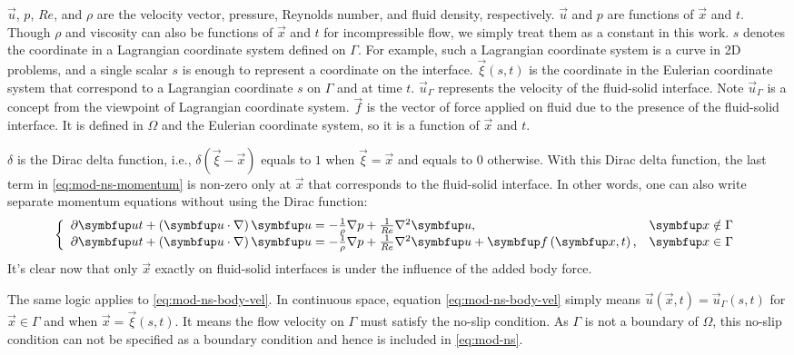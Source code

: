 $\vec{u}$, $p$, $Re$, and $\rho$ are the velocity vector, pressure, Reynolds number, and fluid density, respectively.
$\vec{u}$ and $p$ are functions of $\vec{x}$ and $t$.
Though $\rho$ and viscosity can also be functions of $\vec{x}$ and $t$ for incompressible flow, we simply treat them as a constant in this work.
$s$ denotes the coordinate in a Lagrangian coordinate system defined on $\Gamma$.
For example, such a Lagrangian coordinate system is a curve in 2D problems, and a single scalar $s$ is enough to represent a coordinate on the interface.
$\vec{\xi}(s, t)$ is the coordinate in the Eulerian coordinate system that correspond to a Lagrangian coordinate $s$ on $\Gamma$ and at time $t$.
$\vec{u}_\Gamma$ represents the velocity of the fluid-solid interface.
Note $\vec{u}_\Gamma$ is a concept from the viewpoint of Lagrangian coordinate system.
$\vec{f}$ is the vector of force applied on fluid due to the presence of the fluid-solid interface.
It is defined in $\Omega$ and the Eulerian coordinate system, so it is a function of $\vec{x}$ and $t$.

$\delta$ is the Dirac delta function, i.e., $\delta(\vec{\xi}-\vec{x})$ equals to $1$ when $\vec{\xi} = \vec{x}$ and equals to $0$ otherwise.
With this Dirac delta function, the last term in \eqref{eq:mod-ns-momentum} is non-zero only at $\vec{x}$ that corresponds to the fluid-solid interface.
In other words, one can also write separate momentum equations without using the Dirac function:
\begin{equation}
\left\{
    \begin{array}{ll}
        \pdiff{\vec{u}}{t} + \left(\vec{u} \cdot \nabla\right) \vec{u}
            = -\frac{1}{\rho}\nabla p + \frac{1}{Re} \nabla^2 \vec{u}\text{,} & \vec{x} \notin \Gamma \\
        \pdiff{\vec{u}}{t} + \left(\vec{u} \cdot \nabla\right) \vec{u}
            = -\frac{1}{\rho}\nabla p + \frac{1}{Re} \nabla^2 \vec{u} + \vec{f}\left(\vec{x}, t \right)\text{,} & \vec{x} \in \Gamma \\
    \end{array}
\right. 
\end{equation}
It's clear now that only $\vec{x}$ exactly on fluid-solid interfaces is under the influence of the added body force.

The same logic applies to \eqref{eq:mod-ns-body-vel}.
In continuous space, equation \eqref{eq:mod-ns-body-vel} simply means $\vec{u}\left(\vec{x}, t\right)=\vec{u}_\Gamma\left(s, t\right)$ for $\vec{x} \in \Gamma$ and when $\vec{x}=\vec{\xi}\left(s, t\right)$.
It means the flow velocity on $\Gamma$ must satisfy the no-slip condition.
As $\Gamma$ is not a boundary of $\Omega$, this no-slip condition can not be specified as a boundary condition and hence is included in \eqref{eq:mod-ns}.

